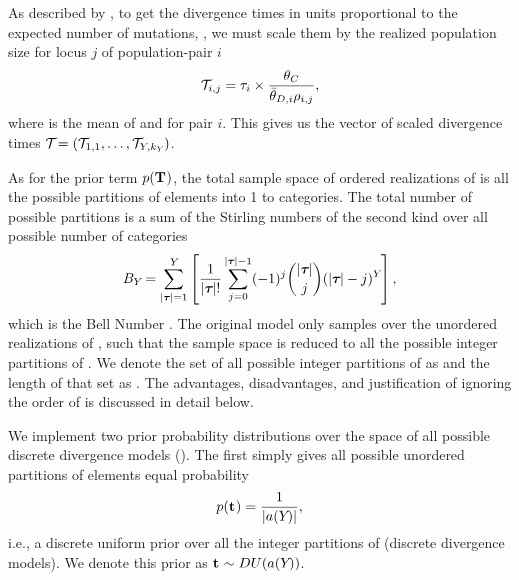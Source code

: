 \documentclass[letterpaper,12pt]{article}
\begin{document}
\begin{linenumbers}
\begin{linenomath}
As described by \citet{Oaks2012}, to get the divergence times in units
proportional to the expected number of mutations, \divTimeScaled{}{}, we must
scale them by the realized population size for locus $j$ of population-pair $i$ 
\begin{equation}
    \divTimeScaled{i}{j} = \divTime{i} \times \frac{\myTheta{C}}{
        \descendantThetaMean{i} \ploidyScalar{i}{j}},
    \label{eq:divTimeScaled}
\end{equation}
where  is the mean of  and
 for pair $i$.
This gives us the vector of scaled divergence times
$\divTimeScaledVector = (\divTimeScaled{1}{1}, \ldots,
\divTimeScaled{\npairs{}}{\nloci{\npairs{}}})$.
\end{linenomath}


\begin{linenomath}
As for the prior term $p(\mathbf{T_{}})$,
the total sample space of ordered realizations of \divTimeMapVector is all the
possible partitions of \npairs{} elements into 1 to \npairs{} categories.
The total number of possible partitions is a sum of the Stirling numbers of
the second kind over all possible number of categories \divTimeNum
\begin{equation}
    B_{Y_{}}=\sum_{\lvert \boldsymbol{\tau_{}} \rvert=1}^{Y_{}} \left[
    \frac{1}{\lvert \boldsymbol{\tau_{}} \rvert!} \sum_{j=0}^{\lvert \boldsymbol{\tau_{}} \rvert-1} (-1)^{j}
    \binom{\lvert \boldsymbol{\tau_{}} \rvert}{j} (\lvert \boldsymbol{\tau_{}} \rvert-j)^{Y_{}} \right],
    \label{eq:bell}
\end{equation}
which is the Bell Number \citep{Bell1934}.
The original \msb model only samples over the unordered realizations of
\divTimeIndexVector, such that the sample space is reduced to all the possible
integer partitions of \npairs{} \citep{Oaks2012,Huang2011,OeisPartitionNumber,
    OeisPartitionTriangle,Malenfant2011}.
We denote the set of all possible integer partitions of \npairs{} as
\integerPartitionSet{\npairs{}} and the length of that set as
\integerPartitionNum{\npairs{}}.
The advantages, disadvantages, and justification of ignoring the order
of \divTimeIndexVector is discussed in detail below.
\end{linenomath}

\begin{linenomath}
We implement two prior probability distributions over the space
of all possible discrete divergence models (\divTimeIndexVector).
The first simply gives all possible unordered partitions of \npairs{} elements
equal probability
\begin{equation}
    p(\mathbf{t_{}}) = \frac{1}{\lvert a({Y_{}}) \rvert},
    \label{eq:divModelPriorUniform}
\end{equation}
i.e., a discrete uniform prior over all the integer partitions of \npairs{}
(discrete divergence models).
We denote this prior as
$\mathbf{t_{}} \sim DU(a({Y_{}}))$.
\end{linenomath}


\end{linenumbers}
\end{document}
